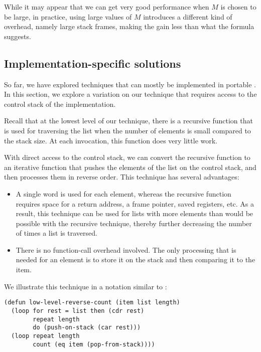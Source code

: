 While it may appear that we can get very good performance when $M$ is
chosen to be large, in practice, using large values of $M$ introduces
a different kind of overhead, namely large stack frames, making the
gain less than what the formula suggests.

\subsection{Implementation-specific solutions}

So far, we have explored techniques that can mostly be implemented in
portable \commonlisp{}.  In this section, we explore a variation on
our technique that requires access to the control stack of the
implementation.

Recall that at the lowest level of our technique, there is a recursive
function that is used for traversing the list when the number of
elements is small compared to the stack size.  At each invocation,
this function does very little work.

With direct access to the control stack, we can convert the recursive
function to an iterative function that pushes the elements of the list
on the control stack, and then processes them in reverse order.  This
technique has several advantages:

\begin{itemize}
\item A single word is used for each element, whereas the recursive
  function requires space for a return address, a frame pointer,
  saved registers, etc.  As a result, this technique can be used for
  lists with more elements than would be possible with the recursive
  technique, thereby further decreasing the number of times a list is
  traversed.
\item There is no function-call overhead involved.  The only
  processing that is needed for an element is to store it on the stack
  and then comparing it to the item.
\end{itemize}

We illustrate this technique in a notation similar to \commonlisp{}:

{\small
\begin{verbatim}
(defun low-level-reverse-count (item list length)
  (loop for rest = list then (cdr rest)
        repeat length
        do (push-on-stack (car rest)))
  (loop repeat length
        count (eq item (pop-from-stack))))
\end{verbatim}
}

